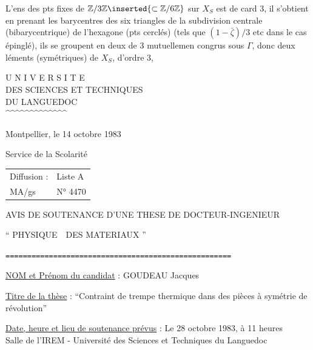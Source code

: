 L'ens des pts fixes de $\mathbb Z/3\mathbb Z\inserted{\subset\mathbb Z/6\mathbb Z}$ sur $X_S$
est de card 3, il s'obtient en prenant
les barycentres des six triangles
de la subdivision centrale (bibarycentrique)
de l'hexagone (pts cerclés) (tels que
$(1-\bar\zeta)/3$ etc dans le cas \unsure{:} épinglé), ils
se groupent en deux  de 3
mutuellemen congrus sous $\Gamma$, donc 
deux léments (symétriques) de $X_S$, d'ordre 3,



\noindent
\begin{minipage}[t]{0.44\linewidth}
\centering
U N I V E R S I T E\\
DES SCIENCES ET TECHNIQUES\\
DU LANGUEDOC\\
\textasciicircum\textasciicircum\textasciicircum\textasciicircum\textasciicircum\textasciicircum\textasciicircum\textasciicircum\textasciicircum\textasciicircum\textasciicircum\textasciicircum\textasciicircum
\end{minipage}\hfill
\begin{minipage}[t]{0.53\linewidth}
\raggedleft
\vspace{\baselineskip}
Montpellier, le 14 octobre 1983
\end{minipage}

Service de la Scolarité

\begin{tabular}{@{}ll@{}}
Diffusion : & Liste A\\
MA/gs & N° 4470
\end{tabular}

\begin{center}
AVIS DE SOUTENANCE D'UNE THESE DE DOCTEUR-INGENIEUR

`` PHYSIQUE\ \ DES MATERIAUX ''

\texttt{====================================================}
\end{center}

\uline{NOM et Prénom du candidat} : GOUDEAU Jacques

\uline{Titre de la thèse} : ``Contraint de trempe thermique dans des pièces à symétrie de révolution''

\uline{Date, heure et lieu de soutenance prévus} : Le 28 octobre 1983, à 11 heures\\
Salle de l'IREM - Université des Sciences et Techniques du Languedoc

